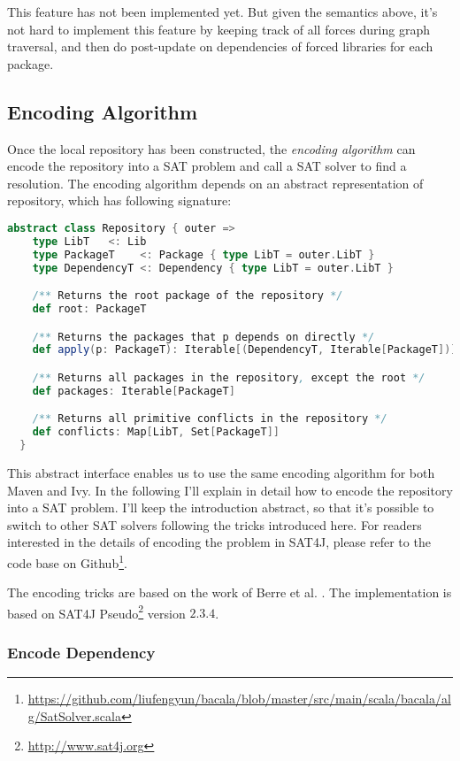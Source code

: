 This feature has not been implemented yet. But given the semantics above, it's not hard to implement this feature by keeping track of all forces during graph traversal, and then do post-update on dependencies of forced libraries for each package.

\subsection{Encoding Algorithm}

Once the local repository has been constructed, the \emph{encoding algorithm} can encode the repository into a SAT problem and call a SAT solver to find a resolution. The encoding algorithm depends on an abstract representation of repository, which has following signature:

\begin{lstlisting}[language=Scala]
  abstract class Repository { outer =>
    type LibT   <: Lib
    type PackageT    <: Package { type LibT = outer.LibT }
    type DependencyT <: Dependency { type LibT = outer.LibT }

    /** Returns the root package of the repository */
    def root: PackageT

    /** Returns the packages that p depends on directly */
    def apply(p: PackageT): Iterable[(DependencyT, Iterable[PackageT])]

    /** Returns all packages in the repository, except the root */
    def packages: Iterable[PackageT]

    /** Returns all primitive conflicts in the repository */
    def conflicts: Map[LibT, Set[PackageT]]
  }
\end{lstlisting}

This abstract interface enables us to use the same encoding algorithm for both Maven and Ivy. In the following I'll explain in detail how to encode the repository into a SAT problem. I'll keep the introduction abstract, so that it's possible to switch to other SAT solvers following the tricks introduced here. For readers interested in the details of encoding the problem in SAT4J, please refer to the code base on Github\footnote{\url{https://github.com/liufengyun/bacala/blob/master/src/main/scala/bacala/alg/SatSolver.scala}}.

The encoding tricks are based on the work of Berre et al. \cite{berre2009dependency}. The implementation is based on SAT4J Pseudo\footnote{\url{http://www.sat4j.org}} version $2.3.4$.

\subsubsection{Encode Dependency}

